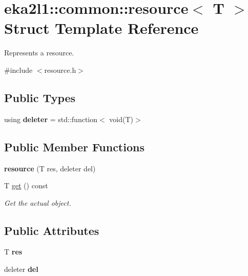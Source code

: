 \hypertarget{structeka2l1_1_1common_1_1resource}{}\section{eka2l1\+:\+:common\+:\+:resource$<$ T $>$ Struct Template Reference}
\label{structeka2l1_1_1common_1_1resource}


Represents a resource.  




{\ttfamily \#include $<$resource.\+h$>$}

\subsection*{Public Types}
\begin{DoxyCompactItemize}
\item 
\mbox{\label{structeka2l1_1_1common_1_1resource_a08f2d97cf16d8b9302f33ef08bb74bb7}} 
using {\bfseries deleter} = std\+::function$<$ void(T)$>$
\end{DoxyCompactItemize}
\subsection*{Public Member Functions}
\begin{DoxyCompactItemize}
\item 
\mbox{\label{structeka2l1_1_1common_1_1resource_ad2724dcffece6a4b45ab7d88e0556798}} 
{\bfseries resource} (T res, deleter del)
\item 
T \mbox{\hyperlink{structeka2l1_1_1common_1_1resource_a7ab875292c58fc8de45498e7bad0ea68}{get}} () const
\begin{DoxyCompactList}\small\item\em Get the actual object. \end{DoxyCompactList}\end{DoxyCompactItemize}
\subsection*{Public Attributes}
\begin{DoxyCompactItemize}
\item 
\mbox{\label{structeka2l1_1_1common_1_1resource_a7ac33e52074e060cf64f26b432001eeb}} 
T {\bfseries res}
\item 
\mbox{\label{structeka2l1_1_1common_1_1resource_afee3a44710c57702ce6b276eb40d4fc6}} 
deleter {\bfseries del}
\end{DoxyCompactItemize}


